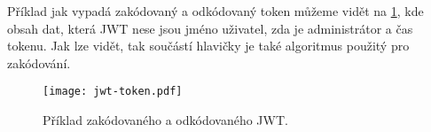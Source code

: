 \par Příklad jak vypadá zakódovaný a odkódovaný token můžeme vidět na \ref{jwt-token-fig}, kde obsah dat, která JWT nese jsou jméno uživatel, zda je administrátor a čas tokenu. Jak lze vidět, tak součástí hlavičky je také algoritmus použitý pro zakódování.

\begin{figure}[htp]
\centering
\texttt{[image: jwt-token.pdf]}
\caption{Příklad zakódovaného a odkódovaného JWT.}
\label{jwt-token-fig}
\end{figure}
